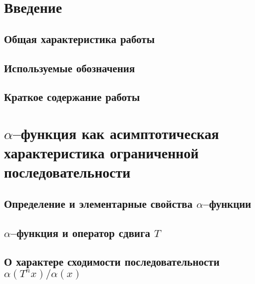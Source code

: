 \documentclass[12pt,a4paper,openbib]{report}
\theoremstyle{definition}
\begin{document}

\setcounter{page}{2}
\tableofcontents

\chapter*{Введение}

\section*{Общая характеристика работы}


\section*{Используемые обозначения}


\section*{Краткое содержание работы}


\chapter{$\alpha$--функция как асимптотическая характеристика ограниченной последовательности}

	\section{Определение и элементарные свойства $\alpha$--функции}
	

	\section{$\alpha$--функция и оператор сдвига $T$}
	

	\section{О характере сходимости последовательности $\alpha(T^n x)/ \alpha(x)$}
	
\end{document}
